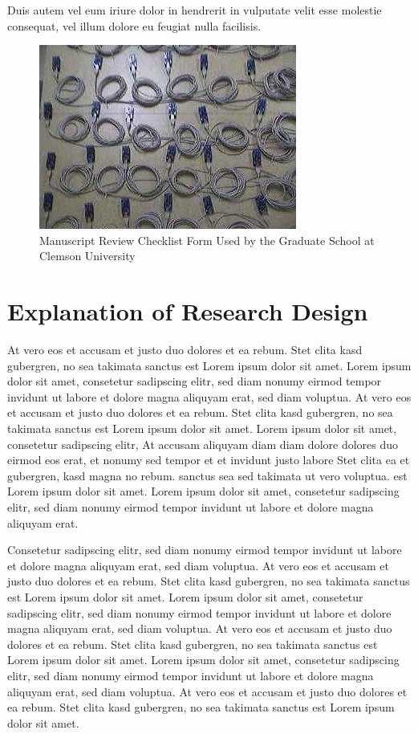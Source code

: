 Duis autem vel eum iriure dolor in hendrerit in vulputate velit esse molestie
consequat, vel illum dolore eu feugiat nulla facilisis.

\begin{figure}
\begin{center}
\includegraphics{testbed}
\end{center}
\caption[Manuscript Review Checklist Form Used by the Graduate School \newline at Clemson University]{Manuscript Review Checklist Form Used by the Graduate School at Clemson University}
\end{figure}

\section{Explanation of Research Design}
At vero eos et accusam et justo duo dolores et ea rebum. Stet clita kasd
gubergren, no sea takimata sanctus est Lorem ipsum dolor sit amet. Lorem ipsum
dolor sit amet, consetetur sadipscing elitr,  sed diam nonumy eirmod tempor
invidunt ut labore et dolore magna aliquyam erat, sed diam voluptua. At vero
eos et accusam et justo duo dolores et ea rebum. Stet clita kasd gubergren, no
sea takimata sanctus est Lorem ipsum dolor sit amet. Lorem ipsum dolor sit
amet, consetetur sadipscing elitr,  At accusam aliquyam diam diam dolore
dolores duo eirmod eos erat, et nonumy sed tempor et et invidunt justo labore
Stet clita ea et gubergren, kasd magna no rebum. sanctus sea sed takimata ut
vero voluptua. est Lorem ipsum dolor sit amet. Lorem ipsum dolor sit amet,
consetetur sadipscing elitr,  sed diam nonumy eirmod tempor invidunt ut labore
et dolore magna aliquyam erat. 

Consetetur sadipscing elitr,  sed diam nonumy eirmod tempor invidunt ut labore
et dolore magna aliquyam erat, sed diam voluptua. At vero eos et accusam et
justo duo dolores et ea rebum. Stet clita kasd gubergren, no sea takimata
sanctus est Lorem ipsum dolor sit amet. Lorem ipsum dolor sit amet, consetetur
sadipscing elitr,  sed diam nonumy eirmod tempor invidunt ut labore et dolore
magna aliquyam erat, sed diam voluptua. At vero eos et accusam et justo duo
dolores et ea rebum. Stet clita kasd gubergren, no sea takimata sanctus est
Lorem ipsum dolor sit amet. Lorem ipsum dolor sit amet, consetetur sadipscing
elitr,  sed diam nonumy eirmod tempor invidunt ut labore et dolore magna
aliquyam erat, sed diam voluptua. At vero eos et accusam et justo duo dolores
et ea rebum. Stet clita kasd gubergren, no sea takimata sanctus est Lorem ipsum
dolor sit amet.

